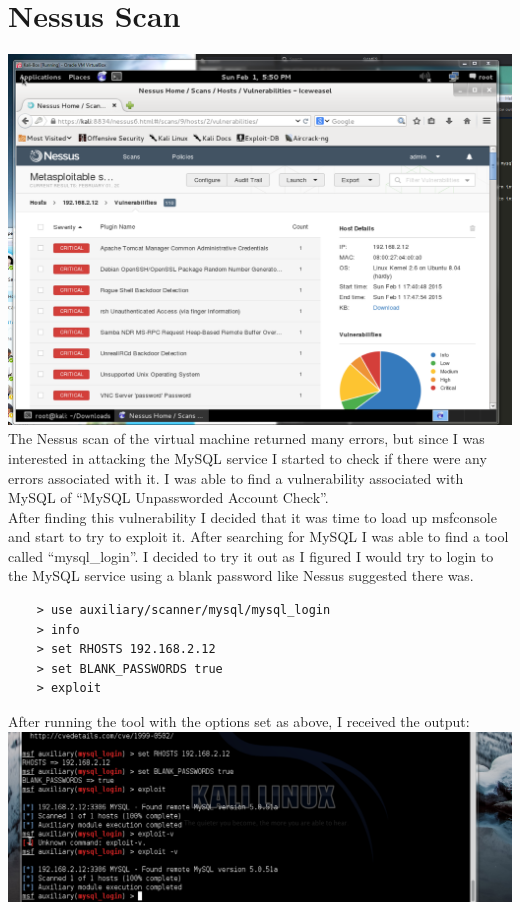 \documentclass[12pt]{report}
\begin{document}
\section{Nessus Scan}
\includegraphics[scale=0.33, width=\linewidth]{nessus_scan.PNG}
The Nessus scan of the virtual machine returned many errors, but since I was interested in attacking the MySQL service I started to check if there were any errors associated with it. I was able to find a vulnerability associated with MySQL of ``MySQL Unpassworded Account Check''.\\
After finding this vulnerability I decided that it was time to load up msfconsole and start to try to exploit it. After searching for MySQL I was able to find a tool called ``mysql\_login''. I decided to try it out as I figured I would try to login to the MySQL service using a blank password like Nessus suggested there was. 
	\begin{verbatim}
	> use auxiliary/scanner/mysql/mysql_login
	> info
	> set RHOSTS 192.168.2.12
	> set BLANK_PASSWORDS true
	> exploit
	\end{verbatim}
After running the tool with the options set as above, I received the output:\
\includegraphics[scale=0.33, width=\linewidth]{blank_password_check_output.PNG}
\end{document}
